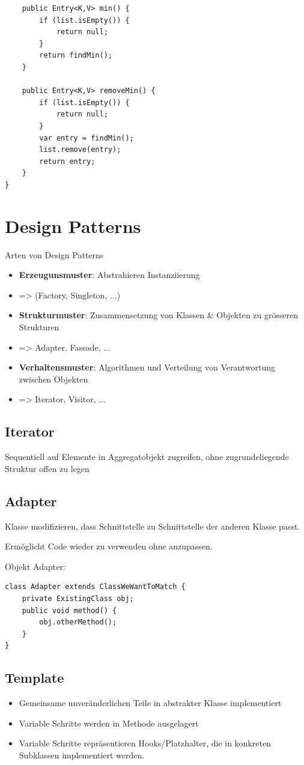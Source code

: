 \begin{multicols*}{4}
\begin{lstlisting}
	public Entry<K,V> min() {
		if (list.isEmpty()) {
			return null;
		}
		return findMin();
	}

	public Entry<K,V> removeMin() {
		if (list.isEmpty()) {
			return null;
		}
		var entry = findMin();
		list.remove(entry);
		return entry;
	}
}
	\end{lstlisting}

\section{Design Patterns}
	Arten von Design Patterns
	\begin{itemize}
		\item \textbf{Erzeugunsmuster}: Abstrahieren Instanziierung 
		\item => (Factory, Singleton, ...)
		\item \textbf{Strukturmuster}: Zusammensetzung von Klassen \& Objekten zu grösseren Strukturen
		\item => Adapter, Fassade, ...
		\item \textbf{Verhaltensmuster}: Algorithmen und Verteilung von Verantwortung zwischen Objekten
		\item => Iterator, Visitor, ...
	\end{itemize}
	\subsection{Iterator}
	Sequentiell auf Elemente in Aggregatobjekt zugreifen, ohne zugrundeliegende Struktur offen zu legen
	
	\subsection{Adapter}
	Klasse modifizieren, dass Schnittstelle zu Schnittstelle der anderen Klasse passt.
	
	Ermöglicht Code wieder zu verwenden ohne anzupassen.
	
	Objekt Adapter:
	\begin{lstlisting}
class Adapter extends ClassWeWantToMatch {
	private ExistingClass obj;
	public void method() {
		obj.otherMethod();
	}
}
	\end{lstlisting}

	\subsection{Template}
	\begin{itemize}
		\item Gemeinsame unveränderlichen Teile in abstrakter Klasse implementiert
		\item Variable Schritte werden in Methode ausgelagert
		\item Variable Schritte repräsentieren Hooks/Platzhalter, die in konkreten Subklassen implementiert werden.
	\end{itemize}


\end{multicols*}
